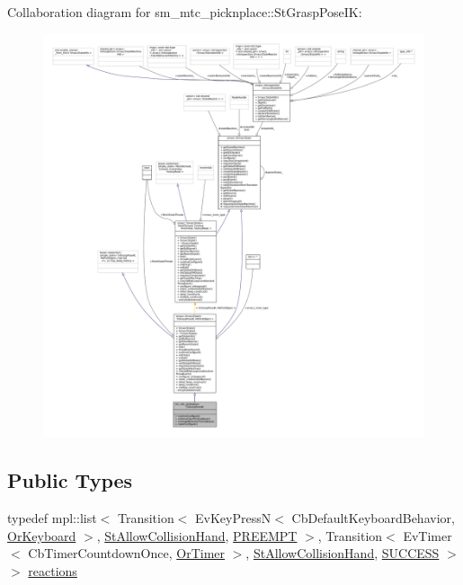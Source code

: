 Collaboration diagram for sm\+\_\+mtc\+\_\+picknplace\+:\+:St\+Grasp\+Pose\+IK\+:
\nopagebreak
\begin{figure}[H]
\begin{center}
\leavevmode
\includegraphics[width=350pt]{structsm__mtc__picknplace_1_1StGraspPoseIK__coll__graph}
\end{center}
\end{figure}
\subsection*{Public Types}
\begin{DoxyCompactItemize}
\item 
typedef mpl\+::list$<$ Transition$<$ Ev\+Key\+PressN$<$ Cb\+Default\+Keyboard\+Behavior, \hyperlink{classsm__mtc__picknplace_1_1OrKeyboard}{Or\+Keyboard} $>$, \hyperlink{structsm__mtc__picknplace_1_1StAllowCollisionHand}{St\+Allow\+Collision\+Hand}, \hyperlink{classPREEMPT}{P\+R\+E\+E\+M\+PT} $>$, Transition$<$ Ev\+Timer$<$ Cb\+Timer\+Countdown\+Once, \hyperlink{classsm__mtc__picknplace_1_1OrTimer}{Or\+Timer} $>$, \hyperlink{structsm__mtc__picknplace_1_1StAllowCollisionHand}{St\+Allow\+Collision\+Hand}, \hyperlink{classSUCCESS}{S\+U\+C\+C\+E\+SS} $>$ $>$ \hyperlink{structsm__mtc__picknplace_1_1StGraspPoseIK_a4361a9c922d0d3e8469b7c2a9a3bdc49}{reactions}
\end{DoxyCompactItemize}
